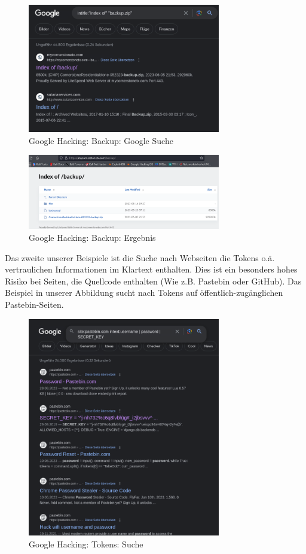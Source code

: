\documentclass{article}
\begin{document}
\begin{figure}[H]
	\includegraphics[width=0.75\textwidth]{images/16}
	\centering
	\caption{Google Hacking: Backup: Google Suche}
\end{figure}

\begin{figure}[H]
	\includegraphics[width=0.75\textwidth]{images/17}
	\centering
	\caption{Google Hacking: Backup: Ergebnis}
\end{figure}

Das zweite unserer Beispiele ist die Suche nach Webseiten die Tokens o.ä. vertraulichen 
Informationen im Klartext enthalten. Dies ist ein besonders hohes Risiko bei Seiten, die 
Quellcode enthalten (Wie z.B. Pastebin oder GitHub). Das Beispiel in unserer Abbildung 
sucht nach Tokens auf öffentlich-zugänglichen Pastebin-Seiten.

\begin{figure}[H]
	\includegraphics[width=0.75\textwidth]{images/18}
	\centering
	\caption{Google Hacking: Tokens: Suche}
\end{figure}
\end{document}
